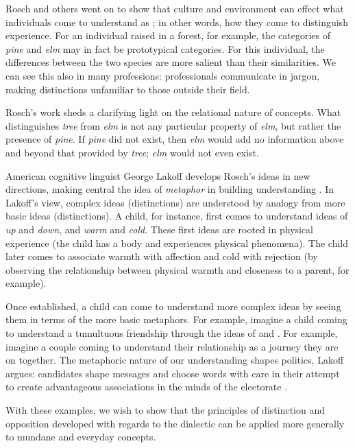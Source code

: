 Rosch and others went on to show that culture and environment can effect what individuals come to understand as ; in other words, how they come to distinguish experience.
For an individual raised in a forest, for example, the categories of \textit{pine} and \textit{elm} may in fact be prototypical categories.
For this individual, the differences between the two species are more salient than their similarities.
We can see this also in many professions: professionals communicate in jargon, making distinctions unfamiliar to those outside their field.

Rosch's work sheds a clarifying light on the relational nature of concepts.
What distinguishes \textit{tree} from \textit{elm} is not any particular property of \textit{elm}, but rather the presence of \textit{pine}.
If \textit{pine} did not exist, then \textit{elm} would add no information above and beyond that provided by \textit{tree}; \textit{elm} would not even exist.

American cognitive linguist George Lakoff develops Rosch's ideas in new directions, making central the idea of \textit{metaphor} in building understanding \cite{lakoff03}.
In Lakoff's view, complex ideas (distinctions) are understood by analogy from more basic ideas (distinctions).
A child, for instance, first comes to understand ideas of \textit{up} and \textit{down}, and \textit{warm} and \textit{cold}.
These first ideas are rooted in physical experience (the child has a body and experiences physical phenomena).
The child later comes to associate warmth with affection and cold with rejection (by observing the relationship between physical warmth and closeness to a parent, for example).

Once established, a child can come to understand more complex ideas by seeing them in terms of the more basic metaphors.
For example, imagine a child coming to understand a tumultuous friendship through the ideas of  and .
For example, imagine a couple coming to understand their relationship as a journey they are on together.
The metaphoric nature of our understanding shapes politics, Lakoff argues: candidates shape messages and choose words with care in their attempt to create advantageous associations in the minds of the electorate \cite{lakoff14}.

With these examples, we wish to show that the principles of distinction and opposition developed with regards to the dialectic can be applied more generally to mundane and everyday concepts.

